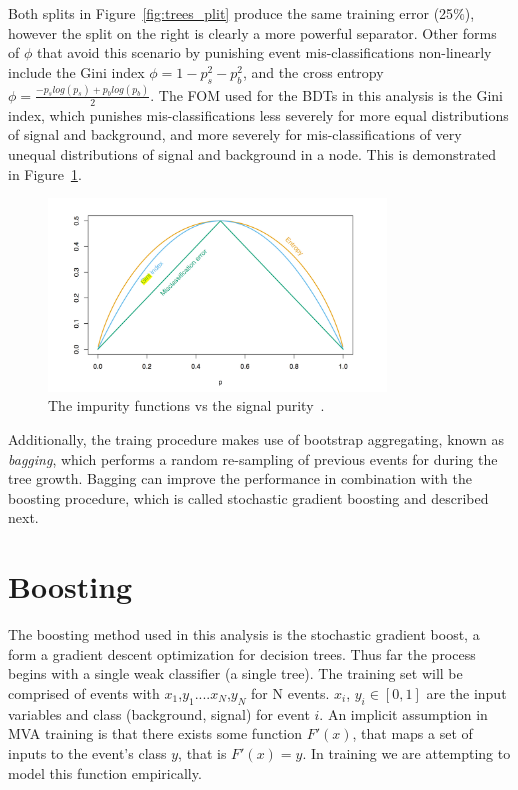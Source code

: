 \noindent Both splits in Figure~\ref{fig:trees_plit} produce
the same training error (25$\%$), however the split on the right is clearly a more powerful separator. Other forms of $\phi$ that avoid this scenario by punishing
event mis-classifications non-linearly include the Gini index $\phi = 1 - p_{s}^{2} - p_{b}^{2}$, and the cross entropy $\phi = \frac{-p_{s}log(p_{s})+p_{b}log(p_{b})}{2}$.
The FOM used for the BDTs in this analysis is the Gini index, which punishes mis-classifications less severely for more equal distributions of signal and background, and more
severely for mis-classifications of very unequal distributions of signal and background in a node. This is demonstrated in Figure~\ref{fig:misclass_plot}.

\begin{figure}[hbtp]
 \begin{center}
   \includegraphics[width=0.8\textwidth]{ap2_figs/misclass_plot.pdf}
   \caption[Plot of misclassifcation impurity functions.]{The impurity functions vs the signal purity~\cite{esii}.}
   \label{fig:misclass_plot}
 \end{center}
\end{figure}

Additionally, the traing procedure makes use of bootstrap aggregating, known as \textit{bagging}, which performs a random re-sampling of previous events for during the tree growth.
Bagging can improve the performance in combination with the boosting procedure, which is called stochastic gradient boosting and described next.  


\section{Boosting}
The boosting method used in this analysis is the stochastic gradient boost, a form a gradient descent optimization for decision trees. Thus far the process begins with a single
weak classifier (a single tree). The training set will be comprised of events with {$x_{1}$,$y_{1}$}....{$x_{N}$,$y_{N}$} for N events. $x_{i}$, $y_{i} \in [0,1]$
are the input variables and class (background, signal) for event $i$. An implicit assumption in MVA training is that there exists
some function $F'(x)$, that maps a set of inputs to the event's class $y$, that is $F'(x) = y$. In training we are attempting to model this function empirically. 

